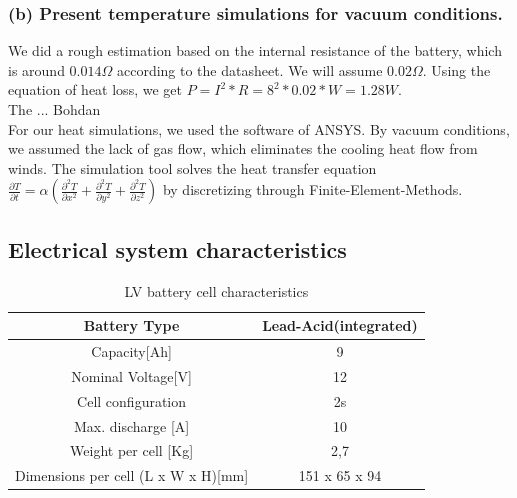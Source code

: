 \subsubsection{(b) Present temperature simulations for vacuum conditions.}
We did a rough estimation based on the internal resistance of the
battery, which is around \(0.014 \Omega \) according to the datasheet. We will assume \(0.02 \Omega\). Using the equation of heat loss, we get \(P = I^2 * R = 8^2 * 0.02 * W = 1.28W\).\\
The ... Bohdan \\


For our heat simulations, we used the software of ANSYS. By vacuum conditions, we assumed the
lack of gas flow, which eliminates the cooling heat flow from winds. The simulation tool solves
the heat transfer equation \( \frac{\partial T}{\partial t} = \alpha \left( \frac{\partial^2 T}{\partial x^2} + \frac{\partial^2 T}{\partial y^2} + \frac{\partial^2 T}{\partial z^2} \right) \)
by discretizing through Finite-Element-Methods.

\subsection{Electrical system characteristics}
\begin{table}[h]
    \centering
    \begin{adjustbox}{width=\textwidth,center}
    \begin{tabular}{|c|c|}
       \hline
       Battery Type & Lead-Acid(integrated)\\
       \hline
       Capacity[Ah] & 9 \\
       \hline
       Nominal Voltage[V] & 12 \\
       \hline
       Cell configuration & 2s \\
       \hline
       Max. discharge [A] & 10 \\
       \hline
       Weight per cell [Kg] & 2,7 \\
       \hline 
       Dimensions per cell (L x W x H)[mm] & 151 x 65 x 94 \\
       \hline 
    \end{tabular}
    \end{adjustbox}
    \label{Low Voltage Cell Specs}
    \caption{LV battery cell characteristics}
\end{table}    

